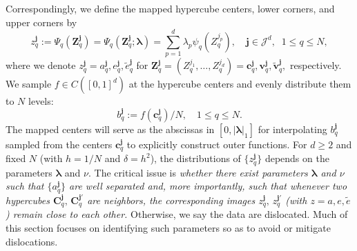 \documentclass[10pt,reqno,final]{amsart}
\theoremstyle{remark}
\theoremstyle{definition}
\newcommand{\bs}[1]{\boldsymbol{#1}}
\newcommand{\wll}[1]{#1}
\begin{document}


Correspondingly, we define the mapped hypercube centers, lower corners, and upper corners by
\begin{equation}\label{aqJaj}
z_q^{\bs j}:=\Psi_q(\bs Z_q^{\bs j})=\Psi_q(\bs Z_q^{\bs j};{\bs \lambda})=\sum_{p=1}^d \lambda_p \psi_q(Z_q^{j_p}),\quad \bs j\in \mathcal J^d,\;\; 1\le q\le N,
\end{equation}
where we denote $z_q^{\bs j}=a_q^{\bs j}, e_q^{\bs j}, \tilde e_q^{\bs j}$
for $\bs Z_q^{\bs j}=(Z_q^{j_1},\ldots, Z_q^{j_d})= \bs c_q^{\bs j}, \bs v_q^{\bs j},\tilde{\bs v}_q^{\bs j},$ respectively.
We sample $f\in C([0,1]^d)$ at the hypercube centers and evenly distribute them to $N$ levels:
\begin{equation}\label{aqJaj2-A0}
 b_q^{\bs j}:={f(\bs c_q^{\bs j})}/N,\quad 1\le q\le N.
\end{equation}
The mapped centers 
will serve as the abscissas in $[0,|\bs \lambda|_1]$ for interpolating  
$b_q^{\bs j}$ sampled from the centers $\bs c_q^{\bs j}$ to explicitly construct outer functions. For $d\ge 2$ and fixed $N$ (with $h=1/N$ and $\delta=h^2$), the distributions of  
$\{z_q^{\bs j}\}$ depends on the parameters $\bs \lambda$ and $\nu$. \wll{The critical issue is {\em whether there exist parameters $\bs \lambda$ and $\nu$ such that  $\{a_q^{\bs j}\}$ are well separated and, more importantly, such that whenever two hypercubes $\bs C_q^{\bs j},\, \bs C_q^{\bs j'}$ are neighbors, the corresponding images $z_q^{\bs j},\, z_q^{\bs j'}$ {\rm(}with $z=a,e,\tilde e${\rm)}  remain close to each other.} Otherwise, we say the data are dislocated.}  Much of this section focuses on identifying such parameters so as to avoid or mitigate dislocations. 
\end{document}
